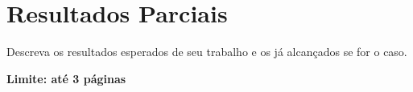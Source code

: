 \chapter{Resultados Parciais}

Descreva os resultados esperados de seu trabalho e os já alcançados se for o caso.

\textbf{Limite: até 3 páginas}